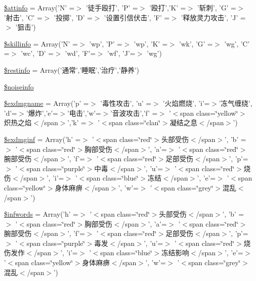 \begin{DoxyCompactItemize}
\item 
\hyperlink{cache_2resources__1_8php_a92eb8a09b2b4554f7502c542f0cdf0d6}{\$attinfo} = Array('N' =$>$ '徒手殴打', 'P' =$>$ '殴打','K' =$>$ '斩刺', 'G' =$>$ '射击', 'C' =$>$ '投掷', 'D' =$>$ '设置引信伏击', 'F' =$>$ '释放灵力攻击', 'J' =$>$ '狙击')
\item 
\hyperlink{cache_2resources__1_8php_a94b9a3413b45767e103c4f7ad2346921}{\$skillinfo} = Array('N' =$>$ 'wp', 'P' =$>$ 'wp', 'K' =$>$ 'wk', 'G' =$>$ 'wg', 'C' =$>$ 'wc', 'D' =$>$ 'wd', 'F'=$>$ 'wf', 'J'=$>$ 'wg')
\item 
\hyperlink{cache_2resources__1_8php_a9eadda2ba19f193cb5b6d373f4ec6e00}{\$restinfo} = Array('通常','睡眠','治疗','静养')
\item 
\hyperlink{cache_2resources__1_8php_a332324f513227af3ea62265b79326383}{\$noiseinfo}
\item 
\hyperlink{cache_2resources__1_8php_ae3d186083abb3ad845df2562e1c1df79}{\$exdmgname} = Array('p' =$>$ '毒性攻击', 'u' =$>$ '火焰燃烧', 'i'=$>$'冻气缠绕', 'd'=$>$'爆炸','e'=$>$'电击','w'=$>$'音波攻击','f' =$>$ '$<$span class=\char`\"{}yellow\char`\"{}$>$炽热之焰$<$/span$>$','k' =$>$ '$<$span class=\char`\"{}clan\char`\"{}$>$凝结之息$<$/span$>$')
\item 
\hyperlink{cache_2resources__1_8php_a2de6851aa38cafa604576a1dc520e631}{\$exdmginf} = Array('h' =$>$ '$<$span class=\char`\"{}red\char`\"{}$>$头部受伤$<$/span$>$', 'b' =$>$ '$<$span class=\char`\"{}red\char`\"{}$>$胸部受伤$<$/span$>$', 'a'=$>$ '$<$span class=\char`\"{}red\char`\"{}$>$腕部受伤$<$/span$>$', 'f'=$>$ '$<$span class=\char`\"{}red\char`\"{}$>$足部受伤$<$/span$>$', 'p'=$>$ '$<$span class=\char`\"{}purple\char`\"{}$>$中毒$<$/span$>$', 'u'=$>$ '$<$span class=\char`\"{}red\char`\"{}$>$烧伤$<$/span$>$', 'i'=$>$ '$<$span class=\char`\"{}blue\char`\"{}$>$冻结$<$/span$>$', 'e'=$>$ '$<$span class=\char`\"{}yellow\char`\"{}$>$身体麻痹$<$/span$>$', 'w'=$>$ '$<$span class=\char`\"{}grey\char`\"{}$>$混乱$<$/span$>$')
\item 
\hyperlink{cache_2resources__1_8php_ac3527ff4180f28da3e03cb071838cc4d}{\$infwords} = Array('h' =$>$ '$<$span class=\char`\"{}red\char`\"{}$>$头部受伤$<$/span$>$', 'b' =$>$ '$<$span class=\char`\"{}red\char`\"{}$>$胸部受伤$<$/span$>$', 'a'=$>$ '$<$span class=\char`\"{}red\char`\"{}$>$腕部受伤$<$/span$>$', 'f'=$>$ '$<$span class=\char`\"{}red\char`\"{}$>$足部受伤$<$/span$>$', 'p'=$>$ '$<$span class=\char`\"{}purple\char`\"{}$>$毒发$<$/span$>$', 'u'=$>$ '$<$span class=\char`\"{}red\char`\"{}$>$烧伤发作$<$/span$>$', 'i'=$>$ '$<$span class=\char`\"{}blue\char`\"{}$>$冻结影响$<$/span$>$', 'e'=$>$ '$<$span class=\char`\"{}yellow\char`\"{}$>$身体麻痹$<$/span$>$', 'w'=$>$ '$<$span class=\char`\"{}grey\char`\"{}$>$混乱$<$/span$>$')

\end{DoxyCompactItemize}
